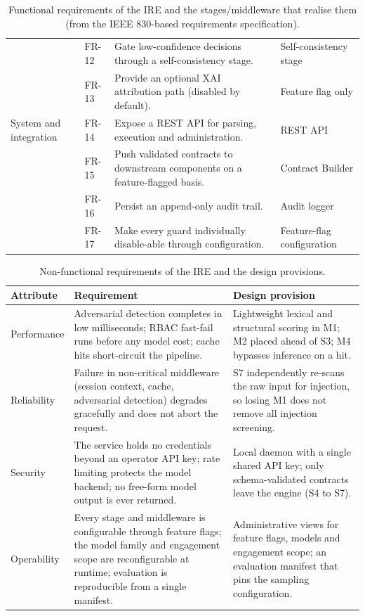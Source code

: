 \begin{table}[htbp]
\begin{tabular}{@{}p{}p{}p{}p{}@{}}
    & FR-12 & Gate low-confidence decisions through a self-consistency stage. & Self-consistency stage\\
    & FR-13 & Provide an optional XAI attribution path (disabled by default). & Feature flag only\\
    System and integration & FR-14 & Expose a REST API for parsing, execution and administration. & REST API\\
    & FR-15 & Push validated contracts to downstream components on a feature-flagged basis. & Contract Builder\\
    & FR-16 & Persist an append-only audit trail. & Audit logger\\
    & FR-17 & Make every guard individually disable-able through configuration. & Feature-flag configuration\\
    \bottomrule
  \end{tabular}
  \caption{Functional requirements of the IRE and the stages/middleware that
  realise them (from the IEEE 830-based requirements specification).}\label{tab:ire-fr}
\end{table}

\begin{table}[htbp]
  \centering
  \begin{tabular}{@{}p{}p{}p{}@{}}
    \toprule
    \textbf{Attribute} & \textbf{Requirement} & \textbf{Design provision}\\
    \midrule
    Performance & Adversarial detection completes in low milliseconds; RBAC fast-fail runs before any model cost; cache hits short-circuit the pipeline. & Lightweight lexical and structural scoring in M1; M2 placed ahead of S3; M4 bypasses inference on a hit.\\
    Reliability & Failure in non-critical middleware (session context, cache, adversarial detection) degrades gracefully and does not abort the request. & S7 independently re-scans the raw input for injection, so losing M1 does not remove all injection screening.\\
    Security & The service holds no credentials beyond an operator API key; rate limiting protects the model backend; no free-form model output is ever returned. & Local daemon with a single shared API key; only schema-validated contracts leave the engine (S4 to S7).\\
    Operability & Every stage and middleware is configurable through feature flags; the model family and engagement scope are reconfigurable at runtime; evaluation is reproducible from a single manifest. & Administrative views for feature flags, models and engagement scope; an evaluation manifest that pins the sampling configuration.\\
    \bottomrule
  \end{tabular}
  \caption{Non-functional requirements of the IRE and the design provisions.}\label{tab:ire-nfr}
\end{table}

